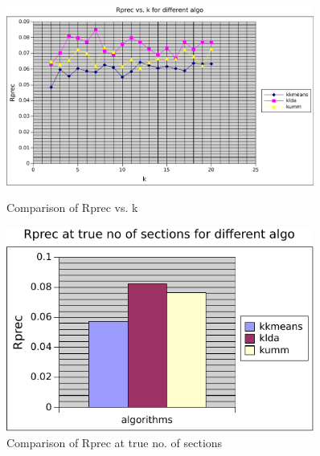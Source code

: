 \begin{figure}
\label{fig:rp_cmp}
    \centering
    \begin{minipage}{0.45\textwidth}
        \centering
        \includegraphics[width=0.9\textwidth]{fig/rprec_comp.pdf}
        \caption{Comparison of Rprec vs. k}
    \end{minipage}\hfill
    \begin{minipage}{0.45\textwidth}
        \centering
        \includegraphics[width=0.9\textwidth]{fig/rprec_k0_comp.pdf}
        \caption{Comparison of Rprec at true no. of sections}
    \end{minipage}
\end{figure}
